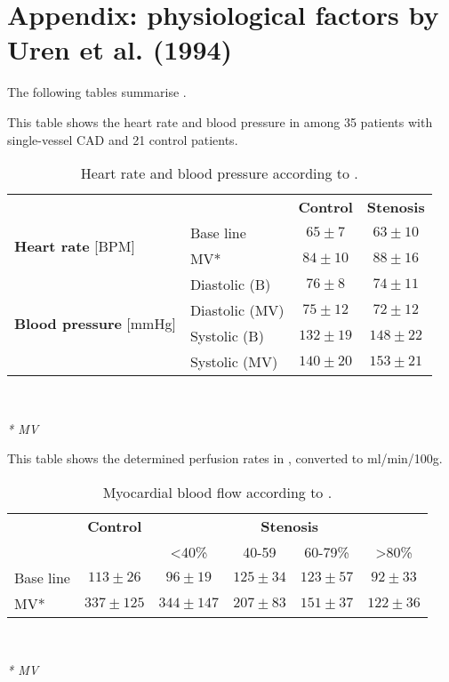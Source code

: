 \chapter{Appendix: physiological factors by Uren et al. (1994)}\label{app:physoverview}
The following tables summarise \cite{uren1994relation}.
\begin{table}[h!]
\caption{Heart rate and blood pressure according to \cite{uren1994relation}.}
This table shows the heart rate and blood pressure in \citep{uren1994relation} among 35 patients with single-vessel \ac{CAD} and 21 control patients.
\begin{tabular}{l|l|cc|}
          \multicolumn{1}{c}{ } & \multicolumn{1}{c}{ } &  \multicolumn{1}{c}{\textbf{Control}} & \multicolumn{1}{c}{\textbf{Stenosis}} \\
          \cline{2-4}
\multirow{2}{*}{\textbf{Heart rate} [BPM]} &  Base line &  $65\pm 7$ &  $63\pm 10$  \\
& MV* &  $84\pm 10$ & $88\pm 16$   \\
\cline{2-4}
\multirow{4}{*}{\textbf{Blood pressure} [mmHg]} & Diastolic (B) & $76\pm 8$ & $74\pm 11$ \\
& Diastolic (MV)& $75\pm 12$ & $72 \pm 12$ \\
& Systolic (B) 	& $132\pm 19$ & $148\pm 22$ \\
& Systolic (MV) & $140\pm 20$ & $153\pm 21$ \\
\cline{2-4}
\end{tabular} \\
\raggedright
\textit{* \acf{MV}}
\label{tab:uren_physfact}
\end{table}

\begin{table}[h!]
\caption{Myocardial blood flow according to \cite{uren1994relation}.}
This table shows the determined perfusion rates in \citep{uren1994relation}, converted to ml/min/100g.\\
\begin{tabular}{l|c|c|c|c|c|}
          \multicolumn{1}{c}{ } & \multicolumn{1}{c}{\textbf{Control}} & \multicolumn{4}{c}{\textbf{Stenosis}}                             \\
        \multicolumn{1}{c}{ }  &    \multicolumn{1}{c}{ }     & \multicolumn{1}{c}{\textless{}40\%} & \multicolumn{1}{c}{40-59}\% & \multicolumn{1}{c}{60-79\%} & \multicolumn{1}{c}{\textgreater{}80\%} \\
          \hline
Base line &     $113\pm 26$    &         $96\pm 19$        &    $125\pm 34$     &    $123\pm 57$     &	$92\pm 33$\\
MV*        &     $337\pm 125$    &  $344\pm 147$  &   $207\pm 83$          &    $151\pm 37$     & $122\pm 36$ \\
\hline
\end{tabular} \\
\raggedright
\textit{* \acf{MV}}
\label{tab:urenFlows}
\end{table}